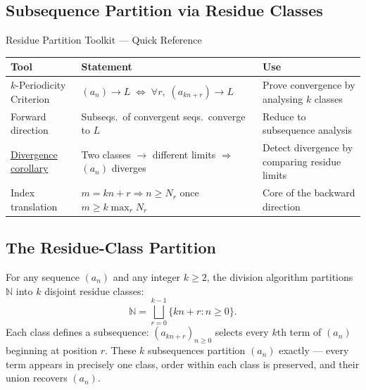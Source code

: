 
\subsection{Subsequence Partition via Residue Classes}
\label{sec:residue-partition}

\begin{toolkitbox}{Residue Partition Toolkit --- Quick Reference}
\small
\begin{tabular}{l l l}
\toprule
\textbf{Tool} & \textbf{Statement} & \textbf{Use} \\
\midrule
$k$-Periodicity Criterion
  & $(a_n)\to L \;\Leftrightarrow\; \forall r,\;(a_{kn+r})\to L$
  & Prove convergence by analysing $k$ classes \\[3pt]
Forward direction
  & Subseqs.\ of convergent seqs.\ converge to $L$
  & Reduce to subsequence analysis \\[3pt]
\hyperref[prop:residue-divergence]{Divergence corollary}
  & Two classes $\to$ different limits $\Rightarrow$ $(a_n)$ diverges
  & Detect divergence by comparing residue limits \\[3pt]
Index translation
  & $m = kn+r \Rightarrow n \geq N_r$ once $m \geq k\max_r N_r$
  & Core of the backward direction \\
\bottomrule
\end{tabular}
\end{toolkitbox}

\subsection*{The Residue-Class Partition}
\label{subsec:residue-partition-def}

For any sequence $(a_n)$ and any integer $k \geq 2$, the division algorithm
partitions $\mathbb{N}$ into $k$ disjoint residue classes:
\[
  \mathbb{N} = \bigsqcup_{r=0}^{k-1} \{kn + r : n \geq 0\}.
\]
Each class defines a subsequence: $(a_{kn+r})_{n \geq 0}$ selects every
$k$th term of $(a_n)$ beginning at position $r$. These $k$ subsequences
partition $(a_n)$ exactly --- every term appears in precisely one class,
order within each class is preserved, and their union recovers $(a_n)$.

